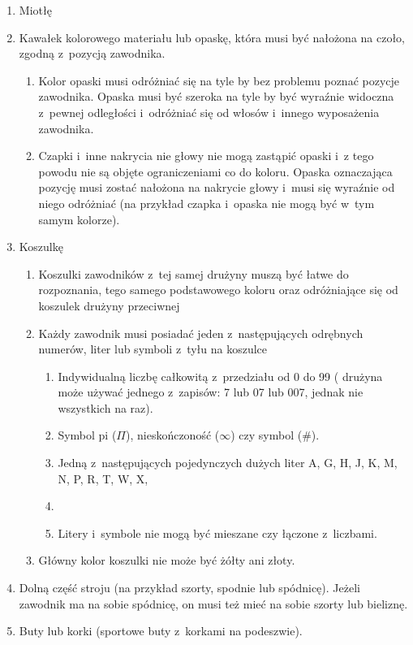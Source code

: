 \documentclass[12pt,a4paper]{article}
\begin{document}
\begin{enumerate}
	\item
	      Miotłę
	\item
	      Kawałek kolorowego materiału lub opaskę, która musi być nałożona na
	      czoło, zgodną z~pozycją zawodnika.

	      \begin{enumerate}
		      \item
		            Kolor opaski musi odróżniać się na tyle by bez problemu poznać
		            pozycje zawodnika.
		            Opaska musi być szeroka na tyle by być wyraźnie widoczna z~pewnej odległości i~odróżniać się od włosów i~innego wyposażenia zawodnika.
		      \item
		            Czapki i~inne nakrycia nie głowy nie mogą zastąpić opaski i~z tego
		            powodu nie są objęte ograniczeniami co do koloru. Opaska oznaczająca
		            pozycję musi zostać nałożona na nakrycie głowy i~musi się wyraźnie
		            od niego odróżniać (na przykład czapka i~opaska nie mogą być w~tym
		            samym kolorze).
	      \end{enumerate}
	\item
	      Koszulkę

	      \begin{enumerate}
		      \item
		            Koszulki zawodników z~tej samej drużyny muszą być łatwe do
		            rozpoznania, tego samego podstawowego koloru oraz odróżniające się
		            od koszulek drużyny przeciwnej
		      \item
		            Każdy zawodnik musi posiadać jeden z~następujących odrębnych
		            numerów, liter lub symboli z~tyłu na koszulce

		            \begin{enumerate}
			            \item
			                  Indywidualną liczbę całkowitą z~przedziału od 0 do 99 ( drużyna
			                  może używać jednego z~zapisów: 7 lub 07 lub 007, jednak nie
			                  wszystkich na raz).
			            \item
			                  Symbol pi ($\Pi$), nieskończoność ($\infty$) czy symbol (\#).
			            \item
			                  Jedną z~następujących pojedynczych dużych liter A, G, H, J, K, M,
			                  N, P, R, T, W, X, \item
			            \item
			                  Litery i~symbole nie mogą być mieszane czy łączone z~liczbami.
		            \end{enumerate}
		      \item
		            Główny kolor koszulki nie może być żółty ani złoty.
	      \end{enumerate}
	\item
	      Dolną część stroju (na przykład szorty, spodnie lub spódnicę). Jeżeli
	      zawodnik ma na sobie spódnicę, on musi też mieć na sobie szorty lub
	      bieliznę.
	\item
	      Buty lub korki (sportowe buty z~korkami na podeszwie).


\end{enumerate}
\end{document}
